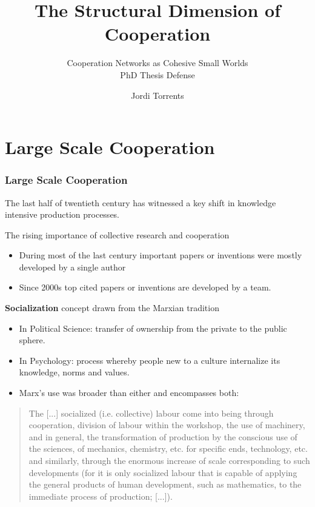 \documentclass[ignorenonframetext,red,8pt,notes=show]{beamer}
\title{The Structural Dimension of Cooperation}
\subtitle{Cooperation Networks as Cohesive Small Worlds\\PhD Thesis Defense}
\author{Jordi Torrents}
\institute{Department of Sociology\\University of Barcelona}
\begin{document}
\begin{frame}[label=portada]
\maketitle
\end{frame}


\section{Large Scale Cooperation}

\begin{frame}
\frametitle{Large Scale Cooperation}

The last half of twentieth century has witnessed a key shift in knowledge intensive production processes.

\begin{block}{The rising importance of collective research and cooperation \citep{uzzi:2007a}}
\begin{itemize}
\item During most of the last century important papers or inventions were mostly developed by a single author 
\item Since 2000s top cited papers or inventions are developed by a team.
\end{itemize}
\end{block}

\pause

\begin{block}{\textbf{Socialization} concept drawn from the Marxian tradition \citep{adler:2007}}
\begin{itemize}
\item In Political Science: transfer of ownership from the private to the public sphere.
\item In Psychology: process whereby people new to a culture internalize its knowledge, norms and values.
\item Marx's use was broader than either and encompasses both:
\end{itemize}
\begin{quote}
The [...] socialized (i.e. collective) labour come into being through cooperation, division of labour within the workshop, the use of machinery, and in general, the transformation of production by the conscious use of the sciences, of mechanics, chemistry, etc. for specific ends, technology, etc. and similarly, through the enormous increase of scale corresponding to such developments (for it is only socialized labour that is capable of applying the general products of human development, such as mathematics, to the immediate process of production; [...]). \citep[1024]{marx:1990}
\end{quote}
\end{block}

\end{frame}
\end{document}
